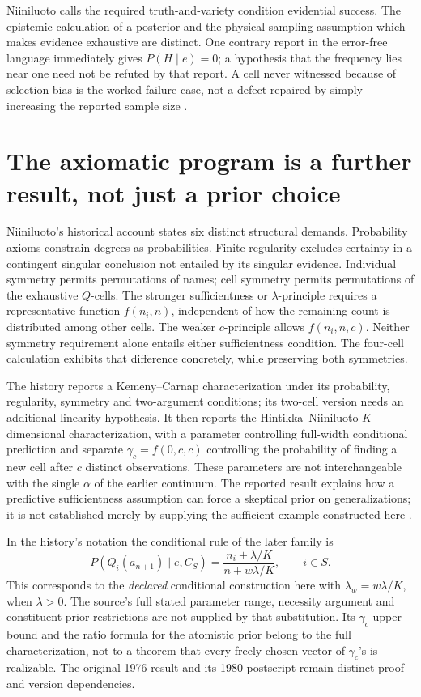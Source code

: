 Niiniluoto calls the required truth-and-variety condition evidential
success. The epistemic calculation of a posterior and the physical
sampling assumption which makes evidence exhaustive are distinct.
One contrary report in the error-free language immediately gives
\(P(H\mid e)=0\); a hypothesis that the frequency lies near one
need not be refuted by that report. A cell never witnessed because of
selection bias is the worked failure case, not a defect repaired by
simply increasing the reported sample size
\cite[pp.~346--350]{Niiniluoto2011HintikkaProgramReading}.

\section{The axiomatic program is a further result, not just a prior choice}
\label{sec:p15-hintikka-axiomatic-program}

Niiniluoto's historical account states six distinct structural demands.
Probability axioms constrain degrees as probabilities. Finite regularity
excludes certainty in a contingent singular conclusion not entailed by
its singular evidence. Individual symmetry permits permutations of names;
cell symmetry permits permutations of the exhaustive \(Q\)-cells.
The stronger sufficientness or \(\lambda\)-principle requires a
representative function \(f(n_i,n)\), independent of how the remaining
count is distributed among other cells. The weaker \(c\)-principle
allows \(f(n_i,n,c)\). Neither symmetry requirement alone entails
either sufficientness condition. The four-cell calculation exhibits that
difference concretely, while preserving both symmetries.

The history reports a Kemeny--Carnap characterization under its
probability, regularity, symmetry and two-argument conditions; its
two-cell version needs an additional linearity hypothesis. It then
reports the Hintikka--Niiniluoto \(K\)-dimensional characterization,
with a parameter controlling full-width conditional prediction and
separate \(\gamma_c=f(0,c,c)\) controlling the probability of
finding a new cell after \(c\) distinct observations. These parameters
are not interchangeable with the single \(\alpha\) of the earlier
continuum. The reported result explains how a predictive sufficientness
assumption can force a skeptical prior on generalizations; it is not
established merely by supplying the sufficient example constructed here
\cite[secs.~3--4, pp.~322--326]{Niiniluoto2011HintikkaProgramReading}.

In the history's notation the conditional rule of the later family is
\[
 P(Q_i(a_{n+1})\mid e,C_S)
       =\frac{n_i+\lambda/K}{n+w\lambda/K},\qquad i\in S.
\]
This corresponds to the \emph{declared} conditional construction here
with \(\lambda_w=w\lambda/K\), when \(\lambda>0\).
The source's full stated parameter range, necessity argument and
constituent-prior restrictions are not supplied by that substitution.
Its \(\gamma_c\) upper bound and the ratio formula for the
atomistic prior belong to the full characterization, not to a theorem
that every freely chosen vector of \(\gamma_c\)'s is realizable.
The original 1976 result and its 1980 postscript remain distinct proof
and version dependencies.

